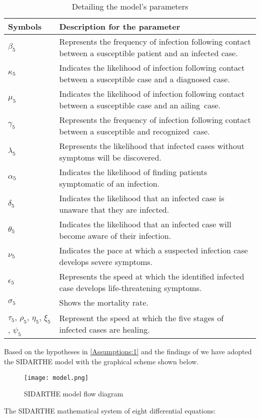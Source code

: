 \documentclass{article}
\begin{document}
\begin{table}[h!]
\centering
\begin{tabular}{ |p{2cm}|p{8cm}| } 
 \hline
\textbf{Symbols}  & \textbf{Description for the parameter} \\[0.5ex]
  \hline
 $\beta_5$ & Represents the frequency of infection following contact between a susceptible patient and an infected case.  \\
\hline
$\kappa_5$  & Indicates the likelihood of infection following contact between a susceptible case and a diagnosed case.    \\
\hline
$\mu_5$  & Indicates the likelihood of infection following contact between a susceptible\index{Susceptible} case and an ailing case.   \\
\hline
$\gamma_5$  & Represents the frequency of infection following contact between a susceptible and recognized case.  \\
\hline
$\lambda_5$  & Represents the likelihood that infected cases without symptoms\index{Symptoms} will be discovered.   \\
\hline
$\alpha_5$  & Indicates the likelihood of finding patients\index{Patients} symptomatic of an infection.  \\
\hline
$\delta_5$  & Indicates the likelihood that an infected case is unaware that they are infected. \\
\hline
$\theta_5$  & Indicates the likelihood that an infected case will become aware of their infection.   \\
\hline
$\nu_5$ & Indicates the pace at which a suspected infection case develops severe symptoms. \\
\hline
$\epsilon_5$  & Represents the speed at which the identified infected case develops life-threatening\index{Life-threatening} symptoms.   \\
\hline
$\sigma_5$  & Shows the mortality\index{Mortality} rate.   \\
\hline
$\tau_5$, $\rho_5$, $\eta_5$, $\xi_5$, $\psi_5$   & Represent the speed at which the five stages of infected cases are healing.   \\[1ex] 
 \hline
\end{tabular}
\caption{Detailing the model's parameters}
\label{table:2}
\end{table}
\newpage
Based on the hypotheses in \ref{Assumptions:1} and the findings of \citep{giordano2020modelling, higazy2020novel, assamagan2020study} we have adopted the SIDARTHE model with the graphical scheme shown below. 
\begin{figure}[h!]
 \begin{center}
\texttt{[image: model.png]}
\caption{SIDARTHE model flow diagram \citep{giordano2020modelling}}
\label{Model:1}
\end{center}
 \end{figure}
The SIDARTHE mathematical system of eight differential equations:\\
 
\end{document}
